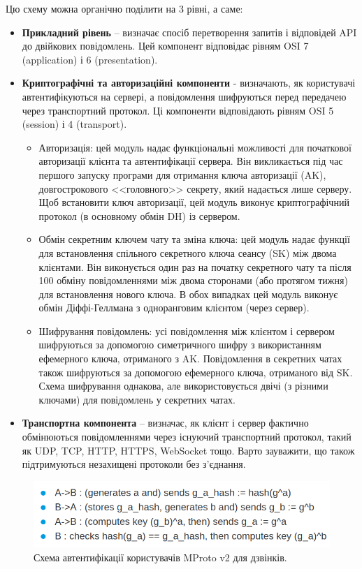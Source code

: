 Цю схему можна органічно поділити на 3 рівні, а саме:
\begin{itemize}
    \item \textbf{Прикладний рівень} -- визначає спосіб перетворення запитів і відповідей API
до двійкових повідомлень. Цей компонент відповідає рівням OSI 7 (application) і 6 (presentation).
    \item \textbf{Криптографічні та авторизаційні компоненти} - визначають, як користувачі автентифікуються на сервері, а повідомлення шифруються перед передачею через транспортний протокол. Ці компоненти відповідають рівням OSI 5 (session) і 4 (transport).
    \begin{itemize}
        \item Авторизація: цей модуль надає функціональні можливості для початкової авторизації клієнта та автентифікації сервера. Він викликається під час першого запуску програми для отримання ключа авторизації (AK), довгострокового <<головного>> секрету, який надається лише серверу. Щоб встановити ключ авторизації, цей модуль виконує криптографічний протокол (в основному обмін DH) із сервером.
        \item Обмін секретним ключем чату та зміна ключа: цей модуль надає функції для встановлення спільного секретного ключа сеансу (SK) між двома клієнтами. Він виконується один раз на початку секретного чату та після 100 обміну повідомленнями між двома сторонами (або протягом тижня) для встановлення нового ключа. В обох випадках цей модуль виконує обмін Діффі-Геллмана з одноранговим клієнтом (через сервер).
        \item Шифрування повідомлень: усі повідомлення між клієнтом і сервером шифруються за допомогою симетричного шифру з використанням ефемерного ключа, отриманого з AK. Повідомлення в секретних чатах також шифруються за допомогою ефемерного ключа, отриманого від SK. Схема шифрування однакова, але використовується двічі (з різними ключами) для повідомлень у секретних чатах.
    \end{itemize}
    \item \textbf{Транспортна компонента} -- визначає, як клієнт і сервер фактично обмінюються повідомленнями через існуючий транспортний протокол, такий як UDP, TCP, HTTP, HTTPS, WebSocket тощо. Варто зауважити, що також підтримуються незахищені протоколи без з’єднання.
\end{itemize}

\begin{figure}[ht]
        \centering
        \includegraphics[scale=0.37]{../IMAGES/user_verification_mtproto2_calls.png}
        \caption{Схема автентифікації користувачів MProto v2 для дзвінків.}
        \label{mproto2_video}
\end{figure}


